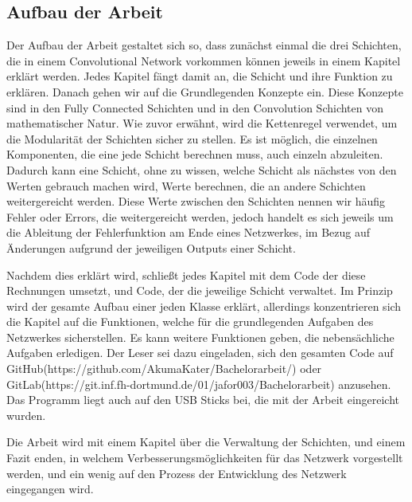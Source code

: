 \documentclass[12pt]{article}
\begin{document}
\subsection{Aufbau der Arbeit}
Der Aufbau der Arbeit gestaltet sich so, dass zunächst einmal die drei Schichten, die in einem Convolutional Network vorkommen können jeweils in einem Kapitel erklärt werden. Jedes Kapitel fängt damit an, die Schicht und ihre Funktion zu erklären. Danach gehen wir auf die Grundlegenden Konzepte ein. Diese Konzepte sind in den Fully Connected Schichten und in den Convolution Schichten von mathematischer Natur. Wie zuvor erwähnt, wird die Kettenregel verwendet, um die Modularität der Schichten sicher zu stellen. Es ist möglich, die einzelnen Komponenten, die eine jede Schicht berechnen muss, auch einzeln abzuleiten. Dadurch kann eine Schicht, ohne zu wissen, welche Schicht als nächstes von den Werten gebrauch machen wird, Werte berechnen, die an andere Schichten weitergereicht werden. Diese Werte zwischen den Schichten nennen wir häufig Fehler oder Errors, die weitergereicht werden, jedoch handelt es sich jeweils um die Ableitung der Fehlerfunktion am Ende eines Netzwerkes, im Bezug auf Änderungen aufgrund der jeweiligen Outputs einer Schicht.

Nachdem dies erklärt wird, schließt jedes Kapitel mit dem Code der diese Rechnungen umsetzt, und Code, der die jeweilige Schicht verwaltet. Im Prinzip wird der gesamte Aufbau einer jeden Klasse erklärt, allerdings konzentrieren sich die Kapitel auf die Funktionen, welche für die grundlegenden Aufgaben des Netzwerkes sicherstellen. Es kann weitere Funktionen geben, die nebensächliche Aufgaben erledigen. Der Leser sei dazu eingeladen, sich den gesamten Code auf GitHub(https://github.com/AkumaKater/Bachelorarbeit/) oder GitLab(https://git.inf.fh-dortmund.de/01/jafor003/Bachelorarbeit) anzusehen. Das Programm liegt auch auf den USB Sticks bei, die mit der Arbeit eingereicht wurden.

Die Arbeit wird mit einem Kapitel über die Verwaltung der Schichten, und einem Fazit enden, in welchem Verbesserungsmöglichkeiten für das Netzwerk vorgestellt werden, und ein wenig auf den Prozess der Entwicklung des Netzwerk eingegangen wird.
\end{document}
